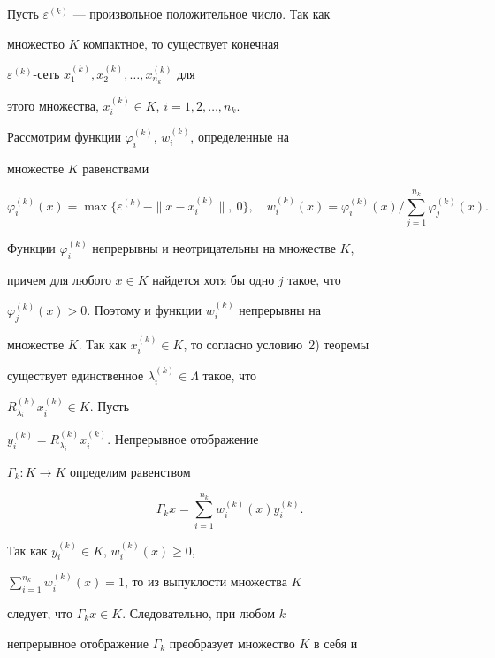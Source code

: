 \begin{pf} 


Пусть $\varepsilon^{(k)}$ --- произвольное положительное число. Так как 


множество $K$ компактное, то существует конечная 


$\varepsilon^{(k)}$-сеть $x^{(k)}_1,x^{(k)}_2,\dotsc,x^{(k)}_{n_k}$ для 


этого множества, $x^{(k)}_i\in K$, $i=1,2,\dotsc,n_k$. 


 


Рассмотрим функции $\varphi^{(k)}_i$, $w^{(k)}_i$, определенные на 


множестве $K$ равенствами 


$$ 


\varphi^{(k)}_i(x)=\max\{\varepsilon^{(k)}- 


\|x-x^{(k)}_i\|,\ 0\},\quad 


w^{(k)}_i(x)=\varphi^{(k)}_i(x)\Big/ 


\sum^{n_k}_{j=1}\varphi^{(k)}_j(x). 


$$ 


 


Функции $\varphi^{(k)}_i$ непрерывны и неотрицательны на множестве $K$, 


причем для любого $x\in K$ найдется хотя бы одно $j$ такое, что 


$\varphi^{(k)}_j(x)>0$. Поэтому и функции $w^{(k)}_i$ непрерывны на 


множестве $K$. Так как $x^{(k)}_i\in K$, то согласно условию~2) теоремы 


существует единственное $\lambda^{(k)}_i\in\Lambda$ такое, что 


$R^{(k)}_{\lambda_i}x^{(k)}_i\in K$. Пусть 


$y^{(k)}_i=R^{(k)}_{\lambda_i}x^{(k)}_i$. Непрерывное отображение 


$\Gamma_k:K\to K$ определим равенством 


$$ 


\Gamma_k x=\sum^{n_k}_{i=1}w^{(k)}_i(x)y^{(k)}_i. 


$$ 


Так как $y^{(k)}_i\in K$, $w^{(k)}_i(x)\ge 0$, 


$\sum\limits^{n_k}_{i=1}w^{(k)}_i(x)=1$, то из выпуклости множества $K$ 


следует, что $\Gamma_k x\in K$. Следовательно, при любом $k$ 


непрерывное отображение $\Gamma_k$ преобразует множество $K$ в себя и 



\end{pf}

